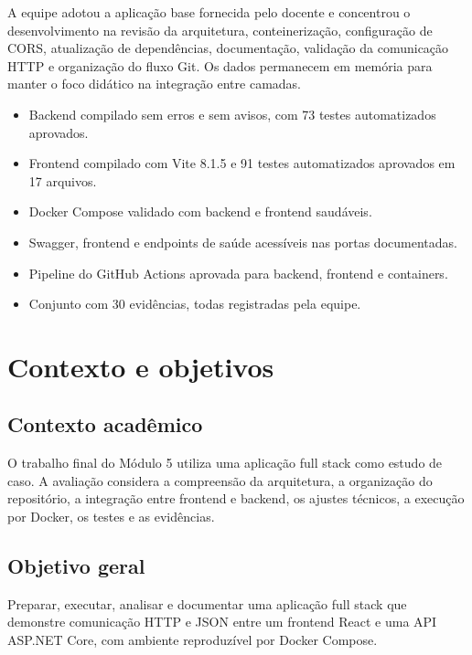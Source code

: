 \documentclass[12pt,a4paper,openany]{report}
\begin{document}
A equipe adotou a aplicação base fornecida pelo docente e concentrou o desenvolvimento na revisão da arquitetura, conteinerização, configuração de CORS, atualização de dependências, documentação, validação da comunicação HTTP e organização do fluxo Git. Os dados permanecem em memória para manter o foco didático na integração entre camadas.

\begin{resumobox}
  \begin{itemize}
    \item Backend compilado sem erros e sem avisos, com 73 testes automatizados aprovados.
    \item Frontend compilado com Vite 8.1.5 e 91 testes automatizados aprovados em 17 arquivos.
    \item Docker Compose validado com backend e frontend saudáveis.
    \item Swagger, frontend e endpoints de saúde acessíveis nas portas documentadas.
    \item Pipeline do GitHub Actions aprovada para backend, frontend e containers.
    \item Conjunto com 30 evidências, todas registradas pela equipe.
  \end{itemize}
\end{resumobox}

\tableofcontents
\clearpage


\chapter{Contexto e objetivos}

\section{Contexto acadêmico}

O trabalho final do Módulo 5 utiliza uma aplicação full stack como estudo de caso. A avaliação considera a compreensão da arquitetura, a organização do repositório, a integração entre frontend e backend, os ajustes técnicos, a execução por Docker, os testes e as evidências.

\section{Objetivo geral}

Preparar, executar, analisar e documentar uma aplicação full stack que demonstre comunicação HTTP e JSON entre um frontend React e uma API ASP.NET Core, com ambiente reproduzível por Docker Compose.
\end{document}
